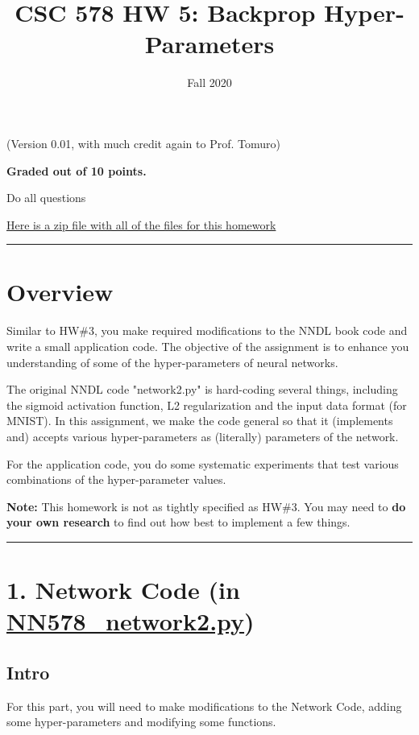 \documentclass[11pt]{article}
\author{Fall 2020}
\date{}
\title{CSC 578 HW 5: Backprop Hyper-Parameters}
\begin{document}
\maketitle
(Version 0.01, with much credit again to Prof. Tomuro)

\textbf{Graded out of 10 points.}

Do all questions

\href{./hw5-files.zip}{Here is a zip file with all of the files for this homework}

\noindent\rule{\textwidth}{0.5pt}
\section*{Overview}
\label{sec:org1aeeb50}

Similar to HW\#3, you make required modifications to the NNDL book code and write a small application code.  The objective of the assignment is to enhance you understanding of some of the hyper-parameters of neural networks.

The original NNDL code "network2.py" is hard-coding several things, including the sigmoid activation function, L2 regularization and the input data format (for MNIST).  In this assignment, we make the code general so that it (implements and) accepts various hyper-parameters as (literally) parameters of the network.

For the application code, you do some systematic experiments that test various combinations of the hyper-parameter values.

\textbf{Note:} This homework is not as tightly specified as HW\#3.  You may need to \textbf{do your own research} to find out how best to implement a few things.

\noindent\rule{\textwidth}{0.5pt}
\section*{1. Network Code (in \href{./NN578\_network2.py}{NN578\_network2.py})}
\label{sec:orgf9065fa}

\subsection*{Intro}
\label{sec:orgba83851}
For this part, you will need to make modifications to the Network Code, adding some hyper-parameters and modifying some functions.
\end{document}
